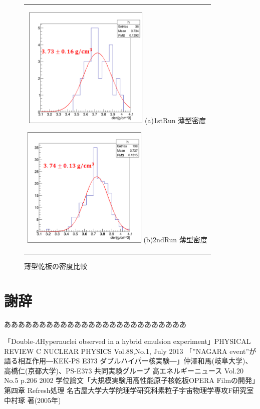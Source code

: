 \documentclass[12pt,a4paper]{jarticle}
\begin{document}
\begin{figure}[htbp]
  \centering
      \begin{tabular}{c}
        \begin{minipage}{0.5\hsize}
          \centering
            \includegraphics[clip, width=60mm]{1stRun_thin_den.png}
            \hspace{1.6cm} (a)1stRun 薄型密度
        \end{minipage}
        
        \begin{minipage}{0.5\hsize}
          \centering
            \includegraphics[clip, width=60mm]{2ndRun_thin_den.png}
            \hspace{1.6cm} (b)2ndRun 薄型密度
        \end{minipage}
    
      \end{tabular}
      \caption{薄型乾板の密度比較\label{fig:compare_thin_den}}
\end{figure}

\section*{謝辞}
ああああああああああああああああああああああああああ
\begin{thebibliography}{99}
 「Double-$\Lambda$Hypernuclei observed in a hybrid emulsion experiment」PHYSICAL REVIEW C NUCLEAR PHYSICS Vol.88,No.1, July 2013
 「”NAGARA event”が語る相互作用―KEK-PS E373 ダブルハイパー核実験―」仲澤和馬(岐阜大学)、高橋仁(京都大学)、PS-E373 共同実験グループ 高エネルギーニュース Vol.20 No.5 p.206 2002
 学位論文「大規模実験用高性能原子核乾板OPERA Filmの開発」第四章 Refresh処理 名古屋大学大学院理学研究科素粒子宇宙物理学専攻F研究室 中村琢 著(2005年)
\end{thebibliography}
\end{document}
